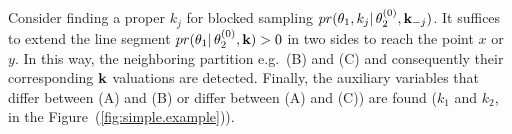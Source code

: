 Consider finding a proper $k_j$ 
for blocked sampling $pr(\theta_1, k_j | \, \theta_2^{(0)}, \textbf{k}_{-j})$. 
It suffices to extend the line segment $pr(\theta_1 | \, \theta_2^{(0)}, \textbf{k})>0$ in two sides to reach the point $x$ or $y$. In this way, the neighboring partition e.g.\ (B) and (C) and consequently their corresponding $\textbf{k}$ valuations are detected. 
Finally, the auxiliary variables that differ between (A) and (B) or differ between (A) and (C)) are found ($k_1$ and $k_2$, in the Figure~(\ref{fig:simple.example})). 


